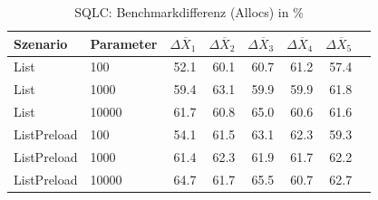 
\begin{table}[ht]
\setlength{\extrarowheight}{-1pt}
\centering
\caption{SQLC: Benchmarkdifferenz (Allocs) in \%}
\begin{tabular}{llrrrrrr}
\toprule
Szenario & Parameter & ${\Delta \overline{X}_1}$ & ${\Delta \overline{X}_2}$ & ${\Delta \overline{X}_3}$ & ${\Delta \overline{X}_4}$ & ${\Delta \overline{X}_5}$ \\
\midrule
	List & 100 & \cellcolor{green!29}  52.1 & \cellcolor{green!26}  60.1 & \cellcolor{green!26}  60.7 & \cellcolor{green!26}  61.2 & \cellcolor{green!27}  57.4 \\
	List & 1000 & \cellcolor{green!26}  59.4 & \cellcolor{green!25}  63.1 & \cellcolor{green!26}  59.9 & \cellcolor{green!26}  59.9 & \cellcolor{green!25}  61.8 \\
	List & 10000 & \cellcolor{green!25}  61.7 & \cellcolor{green!26}  60.8 & \cellcolor{green!24}  65.0 & \cellcolor{green!26}  60.6 & \cellcolor{green!25}  61.6 \\
	ListPreload & 100 & \cellcolor{green!28}  54.1 & \cellcolor{green!25}  61.5 & \cellcolor{green!25}  63.1 & \cellcolor{green!25}  62.3 & \cellcolor{green!26}  59.3 \\
	ListPreload & 1000 & \cellcolor{green!25}  61.4 & \cellcolor{green!25}  62.3 & \cellcolor{green!25}  61.9 & \cellcolor{green!25}  61.7 & \cellcolor{green!25}  62.2 \\
	ListPreload & 10000 & \cellcolor{green!24}  64.7 & \cellcolor{green!25}  61.7 & \cellcolor{green!24}  65.5 & \cellcolor{green!26}  60.7 & \cellcolor{green!25}  62.7 \\
\bottomrule
\end{tabular}
\label{tab:benchmarkdifferenz_sqlc_allocs}
\end{table}
	